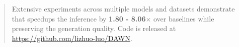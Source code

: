 \begin{abstract}
    Extensive experiments across multiple models and datasets demonstrate that \dawn{} speedups the inference by \textbf{1.80 - 8.06$\times$} over baselines while preserving the generation quality. Code is released at \href{https://github.com/lizhuo-luo/DAWN}{https://github.com/lizhuo-luo/DAWN}.
\end{abstract}




